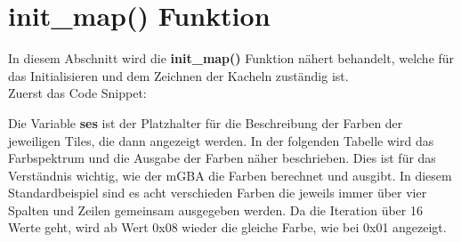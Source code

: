\section{init\_map() Funktion}
In diesem Abschnitt wird die \textbf{init\_map()} Funktion nähert behandelt, welche für das Initialisieren und dem Zeichnen der Kacheln zuständig ist. \\
Zuerst das Code Snippet:



Die Variable \textbf{ses} ist der Platzhalter für die Beschreibung der Farben der jeweiligen Tiles, die dann angezeigt werden. In der folgenden Tabelle wird das Farbspektrum und die Ausgabe der Farben näher beschrieben. Dies ist für das Verständnis wichtig, wie der mGBA die Farben berechnet und ausgibt. In diesem Standardbeispiel sind es acht verschieden Farben die jeweils immer über vier Spalten und Zeilen gemeinsam ausgegeben werden. Da die Iteration über 16 Werte geht, wird ab Wert 0x08 wieder die gleiche Farbe, wie bei 0x01 angezeigt.


